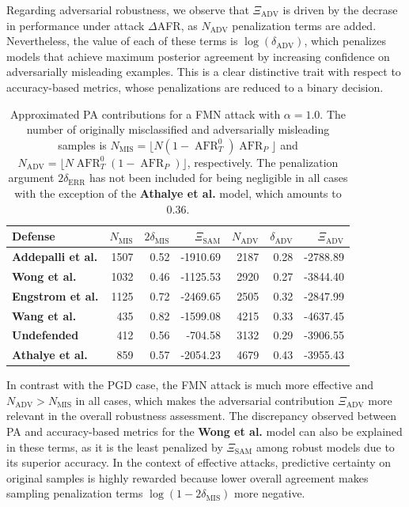 Regarding adversarial robustness, we observe that $\Xi_{\text{ADV}}$ is driven by the decrase in 
performance under attack $\Delta$AFR, as $N_{\text{ADV}}$ penalization terms
are added. Nevertheless, the value of each of these terms is $\log(\delta_{\text{ADV}})$, which penalizes
models that achieve maximum posterior agreement by increasing confidence on adversarially
misleading examples. This is a clear distinctive trait with respect to accuracy-based metrics,
whose penalizations are reduced to a binary decision.


\begin{table}[H]
    \centering
    \begin{tabular}{l|rrr|rrr}
    Defense & $N_{\text{MIS}}$ & $2 \delta_{\text{MIS}}$ & $\Xi_{\text{SAM}}$ & $N_{\text{ADV}}$ & $\delta_{\text{ADV}}$ & $\Xi_{\text{ADV}}$ \\
    \midrule
    {\color{tab:purple} \textbf{Addepalli et al.}} & 1507 & 0.52 & -1910.69 & 2187 & 0.28 & -2788.89 \\
    {\color{tab:red} \textbf{Wong et al.}} & 1032 & 0.46 & -1125.53 & 2920 & 0.27 & -3844.40 \\
    {\color{tab:blue} \textbf{Engstrom et al.}} & 1125 & 0.72 & -2469.65 & 2505 & 0.32 & -2847.99 \\
    {\color{tab:brown} \textbf{Wang et al.}} & 435 & 0.82 & -1599.08 & 4215 & 0.33 & -4637.45 \\
    {\color{tab:orange} \textbf{Undefended}} & 412 & 0.56 & -704.58 & 3132 & 0.29 & -3906.55 \\
    {\color{tab:green} \textbf{Athalye et al.}} & 859 & 0.57 & -2054.23 & 4679 & 0.43 & -3955.43 \\
    \bottomrule
    \end{tabular}
    \caption{
    Approximated PA contributions for a FMN attack with $\alpha = 1.0$. The number of 
    originally misclassified and adversarially misleading
    samples is $N_{\text{MIS}} = \lfloor N (1-\operatorname{AFR}_T^0) \operatorname{AFR}_P \rfloor$ and
    $N_{\text{ADV}} = \lfloor N \operatorname{AFR}_T^0 (1-\operatorname{AFR}_P) \rfloor$, respectively. 
    The penalization argument $2 \delta_{\text{ERR}}$ has not
    been included for being negligible in all cases with the exception of the 
    {\color{tab:green} \textbf{Athalye et al.}} model, which amounts to 0.36. 
    }
    \label{tab:approx_pa_fmn_table}
    \end{table}

In contrast with the PGD case, the FMN attack is much more effective and $N_{\text{ADV}} > N_{\text{MIS}}$
in all cases, which makes the adversarial contribution $\Xi_{\text{ADV}}$ more relevant in the
overall robustness assessment. The discrepancy observed between PA and
accuracy-based metrics for the {\color{tab:red} \textbf{Wong et al.}} model can also be explained 
in these terms, as it is the least penalized by $\Xi_{\text{SAM}}$ among robust models due to its
superior accuracy. In the context of effective attacks, predictive certainty on
original samples is highly rewarded because lower overall agreement makes sampling penalization terms
$\log(1 - 2 \delta_{\text{MIS}})$ more negative. \\

